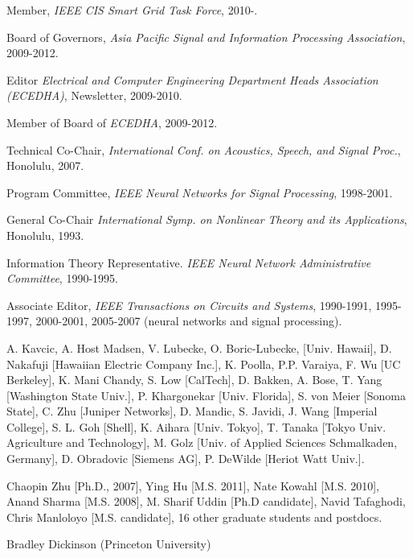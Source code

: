 \begin{Synergistic Activities}

\item Member, {\it IEEE CIS Smart Grid Task Force}, 2010-.
\item Board of Governors, {\it Asia Pacific Signal and Information Processing Association}, 2009-2012.
\item Editor {\it Electrical and Computer Engineering Department Heads  Association
(ECEDHA)},  Newsletter, 2009-2010.
\item Member of Board of  {\it ECEDHA}, 2009-2012.
\item Technical Co-Chair, {\it International Conf. on Acoustics, Speech, and Signal Proc.}, Honolulu, 2007.
\item Program Committee, {\it IEEE Neural Networks for Signal Processing}, 1998-2001.
\item General Co-Chair {\it International Symp. on Nonlinear Theory and its Applications}, Honolulu, 1993.
\item Information Theory Representative. {\it IEEE Neural Network Administrative Committee}, 1990-1995.
\item Associate Editor, {\it IEEE Transactions on Circuits and Systems}, 1990-1991, 1995-1997, 2000-2001, 2005-2007 (neural networks and signal processing).

\end{Synergistic Activities}


\begin{Collaborators and Co-Editors}
\item A. Kavcic, A. Host Madsen, V. Lubecke, O. Boric-Lubecke, [Univ. Hawaii], D. Nakafuji [Hawaiian Electric Company Inc.], K. Poolla, P.P. Varaiya, F. Wu [UC Berkeley], K. Mani Chandy, 
S. Low [CalTech], D. Bakken, A. Bose, T. Yang [Washington State Univ.], P. Khargonekar 
[Univ. Florida], S. von Meier [Sonoma State], C. Zhu [Juniper Networks], D. Mandic, S. Javidi, J. Wang [Imperial College], S. L. Goh [Shell], K. Aihara [Univ. Tokyo], T. Tanaka [Tokyo Univ. Agriculture and Technology], M. Golz [Univ. of Applied Sciences Schmalkaden, Germany], D. Obradovic [Siemens AG], P. DeWilde [Heriot Watt Univ.].
\end{Collaborators and Co-Editors}


\begin{Graduate Advisors and Postdoctoral Sponsors}
\item Chaopin Zhu [Ph.D., 2007], Ying Hu [M.S. 2011], Nate Kowahl [M.S. 2010], Anand Sharma [M.S. 2008],  M. Sharif Uddin [Ph.D candidate], Navid Tafaghodi, Chris  Manloloyo [M.S. candidate], 16 other graduate students and postdocs.

\end{Graduate Advisors and Postdoctoral Sponsors}

\begin{Thesis Advisor and Postgraduate-Scholar Sponsor}
\item Bradley Dickinson (Princeton University)
\end{Thesis Advisor and Postgraduate-Scholar Sponsor}












